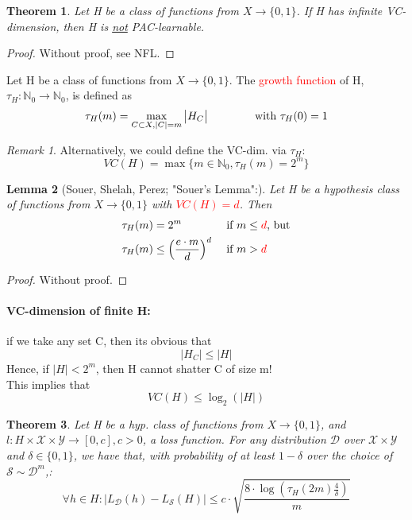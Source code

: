 \documentclass[10pt,a4paper]{article}
\newtheorem{theorem}{Theorem}[section]
\newtheorem{lemma}[theorem]{Lemma}
\theoremstyle{remark}
\newtheorem*{remark}{Remark}
\theoremstyle{definition}
\theoremstyle{plain}
\begin{document}
\begin{theorem}
	Let H be a class of functions from $X \to \{ 0,1 \}$. If H has infinite VC-dimension, then H is \underline{not} PAC-learnable.
\end{theorem}

\begin{proof}
	Without proof, see NFL.
\end{proof}
\begin{boxeddef}
	Let H be a class of functions from $X \to \{ 0,1 \}$. The \textcolor{red}{ growth function} of H, $\tau_H: \mathbb{N}_0 \to \mathbb{N}_0$, is defined as 
	\begin{align*}		
		\tau_H (m) = \max_{C \subset X, |C| = m} \big|H_C\big| \hspace{1.5cm} \text{with } \tau_{H}(0)	= 1
	\end{align*}
\end{boxeddef}

\begin{remark} Alternatively, we could define the VC-dim. via $\tau_{H}$:
$$VC(H) = \max\{m\in\mathbb{N}_0, \tau_{H}(m) = 2^{m}\}$$
\end{remark}

\begin{lemma}[Souer, Shelah, Perez; "Souer's Lemma":] Let H be a hypothesis class of functions from $X \to \{ 0,1 \}$ with \textcolor{red}{$VC(H) = d$}. Then
\begin{align*}
	\tau_{H}(m) &= 2^{m} &&\text{ if } m \leq \text{\textcolor{red}{$d$}, but}\\
	\tau_{H}(m) &\leq \left(\frac{e\cdot m}{d}\right)^{d} &&\text{ if } m > \text{\textcolor{red}{$d$}}
\end{align*}
\end{lemma}
\begin{proof}
	Without proof.
\end{proof}

\paragraph{VC-dimension of finite H:} if we take any set C, then its obvious that 
$$ |H_C| \leq |H|$$
Hence, if $|H| < 2^m$, then H cannot shatter C of size m!\\
This implies that 
$$
	VC(H) \leq \log_2(|H|)
$$

\begin{theorem} Let H be a hyp. class of functions from $X \to \{ 0,1 \}$, and $l: H \times \mathcal{X} \times \mathcal{Y} \to [0, c], c > 0$, a loss function. For any distribution $\mathcal{D}$ over $\mathcal{X} \times \mathcal{Y}$ and $\delta \in \{ 0,1 \}$, we have that, with probability of at least $1-\delta$ over the choice of $\mathcal{S} \sim \mathcal{D}^{m}$,:
$$
	\forall h \in H: \big| L_\mathcal{D}(h) - L_\mathcal{S}(H)  \big| \leq c \cdot \sqrt{\frac{8 \cdot \log\left(\tau_{H}(2m) \frac{4}{\delta}\right)}{m}}
$$

\end{theorem}
\end{document}
